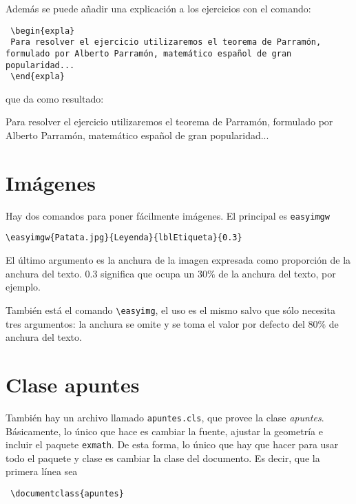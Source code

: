 \documentclass[nochap]{apuntes}
\begin{document}
 Además se puede añadir una explicación a los ejercicios con el comando:
 \begin{verbatim}
 \begin{expla}
 Para resolver el ejercicio utilizaremos el teorema de Parramón, formulado por Alberto Parramón, matemático español de gran popularidad...
 \end{expla}
 \end{verbatim}
 
 que da como resultado:
 \begin{expla}
  Para resolver el ejercicio utilizaremos el teorema de Parramón, formulado por Alberto Parramón, matemático español de gran popularidad...
  \end{expla}
 
\section{Imágenes}

Hay dos comandos para poner fácilmente imágenes. El principal es \texttt{easyimgw}

\begin{verbatim}
\easyimgw{Patata.jpg}{Leyenda}{lblEtiqueta}{0.3}
\end{verbatim}

El último argumento es la anchura de la imagen expresada como proporción de la anchura del texto. $0.3$ significa que ocupa un $30\%$ de la anchura del texto, por ejemplo.


También está el comando \verb|\easyimg|, el uso es el mismo salvo que sólo necesita tres argumentos: la anchura se omite y se toma el valor por defecto del $80\%$ de anchura del texto. 
 
 \section{Clase apuntes}
 
 También hay un archivo llamado \texttt{apuntes.cls}, que provee la clase \textit{apuntes}. Básicamente, lo único que hace es cambiar la fuente, ajustar la geometría e incluir el paquete \texttt{exmath}. De esta forma, lo único que hay que hacer para usar todo el paquete y clase es cambiar la clase del documento. Es decir, que la primera línea sea 
 
 \begin{verbatim}
 \documentclass{apuntes}
 \end{verbatim}
 
\end{document}
